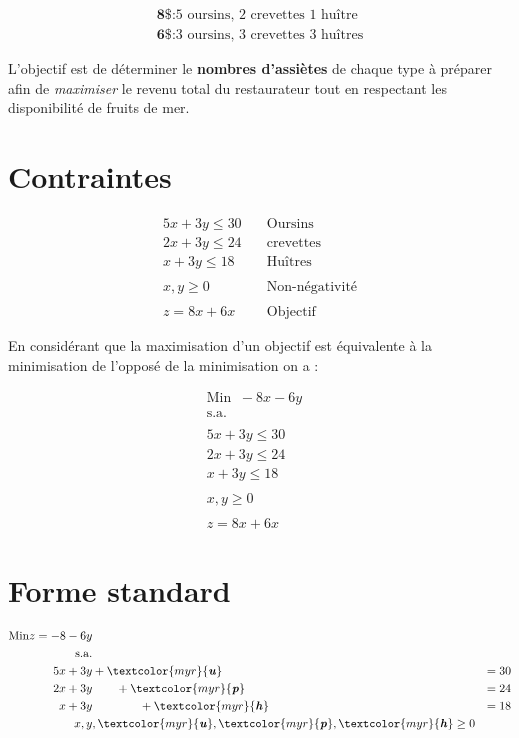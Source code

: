 \documentclass{report}
\begin{document}
\begin{multicols*}{3}
\begin{align*}
    \textbf{8\$} \colon \text{5 oursins, 2 crevettes 1 huître}  \\
    \textbf{6\$} \colon \text{3 oursins, 3 crevettes 3 huîtres}   
\end{align*}

L'objectif est de déterminer le \textbf{nombres d'assiètes} de chaque 
type à préparer afin de \textit{maximiser} 
le revenu total du restaurateur tout en 
respectant les disponibilité de fruits de mer. 


\section{Contraintes}
\begin{align*}
    5x + 3y \leq 30& \quad \text{Oursins} \\
    2x + 3y \leq 24& \quad \text{crevettes} \\ 
    x  + 3y \leq 18& \quad \text{Huîtres}
    \\
    \\ 
    x, y \geq 0& \quad \text{Non-négativité}
    \\ 
    \\
    z = 8x + 6x& \quad \text{Objectif}
\end{align*}




En considérant que la maximisation d'un objectif est 
équivalente à la minimisation de l'opposé de la minimisation on a :


\begin{align*}
    \text{Min} \;\; -8x  -6y& \\
    \text{s.a.}
    \\
    \\
    5x + 3y \leq 30& \\
    2x + 3y \leq 24& \\
    x  + 3y \leq 18& 
    \\
    \\ 
    x, y \geq 0& 
    \\ 
    \\
    z = 8x + 6x& 
\end{align*}


\section{Forme standard}

\begin{align*}
    \text{Min} z = -8 -6y \\ 
    \text{s.a.} 
    \\
    5x + 3y& + \textcolor{myr}{\textbf{\textit{u}}}   &= 30 \\
    2x + 3y& \quad\quad + \textcolor{myr}{\textbf{\textit{p}}}   &= 24\\
     x + 3y& \quad\quad\quad\quad + \textcolor{myr}{\textbf{\textit{h}}}   &= 18 \\
     x, y&,  
     \textcolor{myr}{\textbf{\textit{u}}}, 
     \textcolor{myr}{\textbf{\textit{p}}},
     \textcolor{myr}{\textbf{\textit{h}}} \geq 0
\end{align*}


\end{multicols*}
\end{document}
